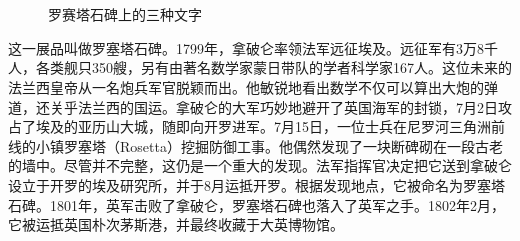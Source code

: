 \documentclass[b5paper]{ctexart}
\begin{document}
\begin{figure}[htbp]
  \centering
   \\
   \\
  \caption{罗赛塔石碑上的三种文字}
  \label{fig:rosetta-stone}
 \end{figure}

这一展品叫做罗塞塔石碑。1799年，拿破仑率领法军远征埃及。远征军有3万8千人，各类舰只350艘，另有由著名数学家蒙日带队的学者科学家167人\cite{Harrison-2023}。这位未来的法兰西皇帝从一名炮兵军官脱颖而出。他敏锐地看出数学不仅可以算出大炮的弹道，还关乎法兰西的国运。拿破仑的大军巧妙地避开了英国海军的封锁，7月2日攻占了埃及的亚历山大城，随即向开罗进军。7月15日，一位士兵在尼罗河三角洲前线的小镇罗塞塔（Rosetta）挖掘防御工事。他偶然发现了一块断碑砌在一段古老的墙中。尽管并不完整，这仍是一个重大的发现。法军指挥官决定把它送到拿破仑设立于开罗的埃及研究所，并于8月运抵开罗。根据发现地点，它被命名为罗塞塔石碑。1801年，英军击败了拿破仑，罗塞塔石碑也落入了英军之手。1802年2月，它被运抵英国朴次茅斯港，并最终收藏于大英博物馆。
\end{document}
